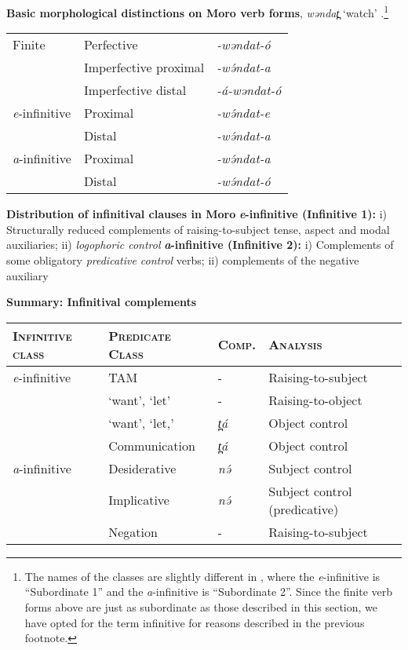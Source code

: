 \ea \textbf{Basic morphological distinctions on Moro verb forms}, \textit{wəndat̪} `watch' \citep{rose13}.\footnote{The names of the classes are slightly different in \citep{rose13}, where the \textit{e}-infinitive is ``Subordinate 1'' and the \textit{a}-infinitive is ``Subordinate 2''. Since the finite verb forms above are just as subordinate as those described in this section, we have opted for the term infinitive for reasons described in the previous footnote.}\\
 \begin{tabular}[l]{lll}
\hline
Finite & Perfective & \textit{-wəndat-ó} \\
& Imperfective proximal & \textit{-wə́ndat-a} \\
& Imperfective distal &  \textit{-á-wəndat-ó}\\
\hline
\textit{e}-infinitive & Proximal & \textit{-wə́ndat-e} \\
&  Distal &  \textit{-wə́ndat-a} \\
\hline
\textit{a}-infinitive & Proximal & \textit{-wə́ndat-a} \\
&  Distal &  \textit{-wə́ndat-ó} \\
\hline
 \end{tabular}
\z
 

\ea \textbf{Distribution of infinitival clauses in Moro}
\ea  \textbf{\textit{e}-infinitive (Infinitive 1):} i) Structurally reduced complements of raising-to-subject tense, aspect and modal auxiliaries; ii) \textit{logophoric control}
\ex \textbf{\textit{a}-infinitive (Infinitive 2):} i) Complements of some obligatory \textit{predicative control} verbs; ii) complements of the negative auxiliary
\z 
\z 

\ea \textbf{Summary: Infinitival complements}\\ \label{infsum}
\begin{tabular}[t]{llll}
\hline
\textsc{Infinitive class} & \textsc{Predicate Class} & \textsc{Comp.} & \textsc{Analysis} \\
\hline
\textit{e}-infinitive & TAM & - & Raising-to-subject \\
   & `want', `let' & - & Raising-to-object \\
   & `want', `let,'  & \textit{t̪á} & Object control  \\ 
      & Communication & \textit{t̪á} & Object control  \\ 
\textit{a}-infinitive & Desiderative & \textit{nə́} & Subject control  \\
   & Implicative & \textit{nə́} & Subject control (predicative) \\
   & Negation & - & Raising-to-subject \\ 
\hline
\end{tabular}
\z 

